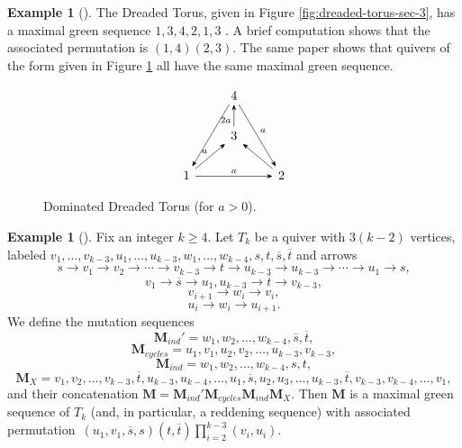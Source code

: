 \documentclass[11pt, letterpaper]{amsart}
\theoremstyle{definition}
\newtheorem{example}[theorem]{Example}
\numberwithin{equation}{section}
\begin{document}
\begin{example}[{\cite[Examples~3.6,4.8]{MR4183151}}]
\label{fig:dreaded torus}
    The Dreaded Torus, given in Figure \ref{fig:dreaded-torus-sec-3}, has a maximal green sequence $1,3,4,2,1,3$ \cite{MR4183151}. A brief computation shows that the associated permutation is $(1,4) (2,3)$.
    The same paper shows that quivers of the form given in Figure \ref{fig:dreaded-torus-dominated} all have the same maximal green sequence.
    \begin{figure}[ht]
        \centering
        \[\begin{tikzcd}[every arrow/.append style = {-{Stealth}}]
        & 4 \\
        & 3 \\
        1 & & 2 
        \arrow[from=2-2, to=1-2, "2a", pos=0.3]
        \arrow[from=3-1, to=2-2, "a"]
        \arrow[from=3-3, to=2-2]
        \arrow[from=1-2, to=3-1 ]
        \arrow[from=3-1, to=3-3, "a"]
        \arrow[from=1-2, to=3-3, "a"]
        \end{tikzcd}\]
        \caption{Dominated Dreaded Torus (for $a > 0$).}
        \label{fig:dreaded-torus-dominated}
    \end{figure}
\end{example}

\begin{example}[{\cite[Section 5]{MR3695872}}]
\label{eg:punctured spheres}
Fix an integer $k \geq 4$. 
Let $T_k$ be a quiver with $3(k-2)$ vertices, labeled
$v_1, \ldots, v_{k-3}, u_1, \ldots, u_{k-3}, w_{1}, \ldots, w_{k-4}, s, t, \overline s, \overline t$
and arrows 
$$s \rightarrow v_1 \rightarrow v_2 \rightarrow \cdots \rightarrow v_{k-3} \rightarrow t \rightarrow u_{k-3} \rightarrow u_{k-3} \rightarrow \cdots \rightarrow u_{1} \rightarrow s, $$
$$v_1 \rightarrow \overline s \rightarrow u_1, u_{k-3} \rightarrow \overline t \rightarrow v_{k-3},$$
$$ v_{i+1} \rightarrow w_i \rightarrow v_i,$$
$$ u_{i} \rightarrow w_i \rightarrow u_{i+1}.$$ 
We define the mutation sequences
$$\mathbf M_{ind}' = w_1, w_2, \ldots, w_{k-4}, \overline s, \overline t,$$
$$\mathbf M_{cycles} = u_1, v_1, u_2, v_2, \ldots, u_{k-3}, v_{k-3},$$
$$\mathbf M_{ind} = w_1, w_2, \ldots, w_{k-4}, s, t,$$
$$\mathbf M_{X} = v_1, v_2, \ldots, v_{k-3}, \overline t, u_{k-3}, u_{k-4}, \ldots, u_1, \overline s, u_2, u_3, \ldots, u_{k-3}, \overline t, v_{k-3}, v_{k-4}, \ldots, v_1,$$
and their concatenation $\mathbf M = \mathbf M_{ind}' \mathbf M_{cycles} \mathbf M_{ind} \mathbf M_{X}$.
Then $\mathbf M$ is a maximal green sequence of $T_k$ (and, in particular, a reddening sequence) with associated permutation~$( u_1, v_1, \overline s,  s) (t, \overline t)  \prod_{i=2}^{k-3}(v_i, u_i)$.
\end{example}
\end{document}
